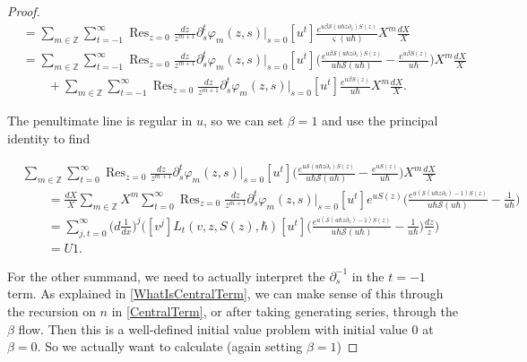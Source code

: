 \documentclass[10pt,a4paper,oneside,no-math,reqno]{amsart}%
\theoremstyle{plain}
\theoremstyle{definition}
\theoremstyle{remark}
\numberwithin{equation}{section}
\renewcommand{\phi}{\varphi}
\newcommand{\mb}[1]{\mathbb{#1}}
\newcommand{\mc}[1]{\mathcal{#1}}
\newcommand{\1}{\mathds{1}}
\newcommand{\Z}{\mb{Z}}
\newcommand{\<}{\langle}
\renewcommand{\>}{\rangle}
\newcommand{\del}{\partial}
\DeclareMathOperator*{\Res}{Res}
\DeclareMathOperator{\ad}{ad}
\begin{document}
\begin{proof}
\begin{equation}
\begin{split}
			&=
			\sum_{m \in \Z} \sum_{t=-1}^\infty \Res_{z=0} \frac{dz}{z^{m+1}} \del_s^t \phi_m(z,s )\Big|_{s = 0} [u^t ] \frac{e^{u \beta \mc{S}(u \hbar z \del_z)S(z)}}{ \varsigma (u \hbar)} X^m \frac{dX}{X}
			\\
			&=
			\sum_{m \in \Z} \sum_{t=-1}^\infty \Res_{z=0} \frac{dz}{z^{m+1}} \del_s^t \phi_m(z,s )\Big|_{s = 0} [u^t ] \Big( \frac{e^{u \beta \mc{S}(u \hbar z \del_z)S(z)}}{u\hbar \mc{S}(u \hbar)} - \frac{e^{u \beta S(z)}}{u\hbar} \Big) X^m \frac{dX}{X}
			\\
			& \qquad
			+ \sum_{m \in \Z} \sum_{t=-1}^\infty \Res_{z=0} \frac{dz}{z^{m+1}} \del_s^t \phi_m(z,s )\Big|_{s = 0} [u^t ] \frac{e^{u \beta S(z)}}{u\hbar}  X^m \frac{dX}{X} .
		\end{split}
	\end{equation}

	The penultimate line is regular in $u$, so we can set $ \beta = 1$ and use the principal identity to find

	\begin{equation}
		\begin{split}
			&\sum_{m \in \Z} \sum_{t=0}^\infty \Res_{z=0} \frac{dz}{z^{m+1}} \del_s^t \phi_m(z,s )\Big|_{s = 0} [u^t ] \Big( \frac{e^{u \mc{S}(u \hbar z \del_z)S(z)}}{u\hbar \mc{S}(u \hbar)} - \frac{e^{u S(z)}}{u\hbar} \Big) X^m \frac{dX}{X}
			\\
			&\qquad =
			\frac{dX}{X} \sum_{m \in \Z} X^m \sum_{t=0}^\infty \Res_{z=0} \frac{dz}{z^{m+1}} \del_s^t \phi_m(z,s )\Big|_{s = 0} [u^t ] e^{uS(z)}\Big( \frac{e^{u (\mc{S}(u \hbar z \del_z)-1)S(z)}}{u\hbar \mc{S}(u \hbar)} - \frac{1}{u\hbar} \Big)
			\\
			&\qquad =
			\sum_{j,t=0}^\infty \big( d \frac{1}{dx} \big)^j \Big( [v^j] L_t (v, z, S(z),\hbar) [u^t] \Big( \frac{e^{u (\mc{S}(u \hbar z \del_z)-1)S(z)}}{u\hbar \mc{S}(u \hbar)} - \frac{1}{u\hbar} \Big) \frac{dz}{z} \Big) 
			\\
			&\qquad =
			U1 .
		\end{split}
	\end{equation}

	For the other summand, we need to actually interpret the $ \del_s^{-1}$ in the $ t = -1$ term. As explained in \cref{WhatIsCentralTerm}, we can make sense of this through the recursion on $n $ in \cref{CentralTerm}, or after taking generating series, through the $\beta $ flow. Then this is a well-defined initial value problem with initial value $0$ at $ \beta = 0$. So we actually want to calculate (again setting $ \beta = 1$)


\end{proof}
\end{document}
